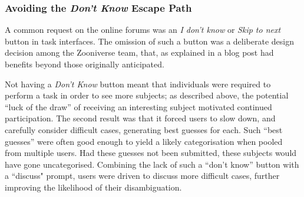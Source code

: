 \documentclass{sigchi}
\begin{document}


\subsubsection{Avoiding the \emph{Don't Know} Escape Path}
A common request on the online forums was an \emph{I don't know} or \emph{Skip to next} button in task interfaces.  The omission of such a button was a deliberate design decision among the Zooniverse team, that, as explained in a blog post\cite{zooniverseblog} had benefits beyond those originally anticipated.

Not having a \emph{Don't Know} button meant that individuals were required to perform a task in order to see more subjects; as described above, the  potential ``luck of the draw'' of receiving an interesting subject motivated continued participation.  The second result was that it forced users to slow down, and carefully consider difficult cases, generating best guesses for each.  Such ``best guesses'' were often good enough to yield a likely categorisation when pooled from multiple users.  Had these guesses not been submitted, these subjects would have gone uncategorised.  Combining the lack of such a ``don't know'' button with a  ``discuss" prompt, users were driven to discuss more difficult cases, further improving the likelihood of their disambiguation.  %
\end{document}
